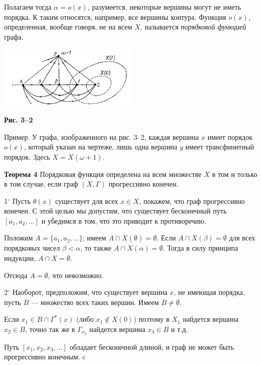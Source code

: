 Полагаем тогда $\alpha = o(x)$, разумеется, некоторые вершины могут не иметь порядка. К таким относятся, например, все вершины контура. Функция $o(x)$, определенная, вообще говоря, не на всем $X$, называется \textit{порядковой функцией} графа.

\begin{center}
\includegraphics[width=0.5\textwidth]{graph.png}
\end{center}

\textbf{Рис. 3--2}

Пример. У графа, изображенного на рис. 3--2, каждая вершина $x$ имеет порядок $o(x)$, который указан на чертеже, лишь одна вершина $y$ имеет трансфинитный порядок. Здесь $X = X(\omega + 1)$.

\textbf{Теорема 4} Порядковая функция определена на всем множестве $X$ в том и только в том случае, если граф $(X, \Gamma)$ прогрессивно конечен.

1$^\circ$ Пусть $\theta(x)$ существует для всех $x \in X$, покажем, что граф прогрессивно конечен. С этой целью мы допустим, что существует бесконечный путь $[a_1, a_2, \ldots]$ и убедимся в том, что это приводит к противоречию.

Положим $A = \{a_1, a_2, \ldots\}$; имеем $A \cap X(\emptyset) = \emptyset$. Если $A \cap X(\beta) = \emptyset$ для всех порядковых чисел $\beta < \alpha$, то также $A \cap X(\alpha) = \emptyset$. Тогда в силу принципа индукции, $A \cap X = \emptyset$.

Отсюда $A = \emptyset$, что невозможно.

2$^\circ$ Наоборот, предположим, что существует вершина $x$, не имеющая порядка, пусть $B$ — множество всех таких вершин. Имеем $B \neq \emptyset$.

Если $x_1 \in B \cap \Gamma^*(x)$ (либо $x_1 \notin X(0)$) поэтому в $X_1$ найдется вершина $x_2 \in B$, точно так же в $\Gamma_{x_2}$ найдется вершина $x_3 \in B$ и т.д.

Путь $[x_1, x_2, x_3, \ldots]$ обладает бесконечной длиной, и граф не может быть прогрессивно конечным.
c